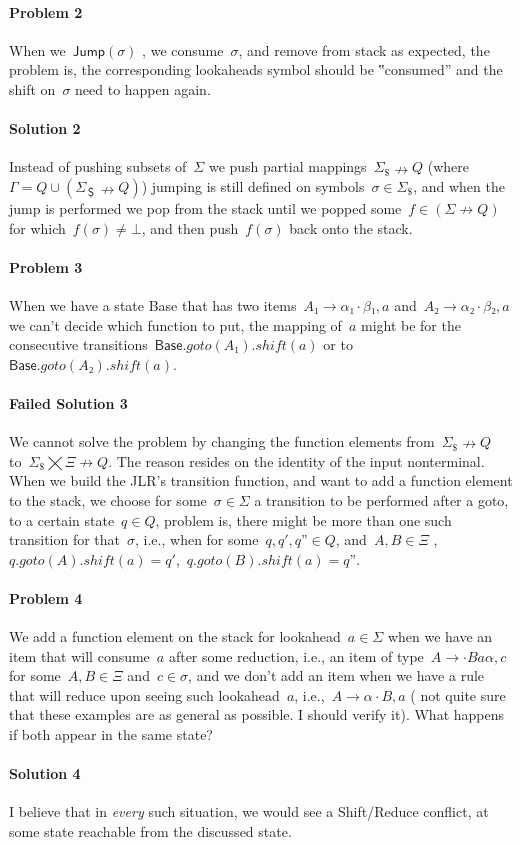 \paragraph{Problem 2} When we~$\textsf{Jump}(σ)$ , we consume~$σ$, and remove
  from stack as expected, the problem is, the corresponding lookaheads symbol
  should be ‟consumed” and the shift on~$σ$ need to happen again.

\paragraph{Solution 2} Instead of pushing subsets of~$Σ$ we push partial
  mappings~$Σ_{\$}↛Q$ (where~$Γ=Q∪(Σ_{＄}↛Q)$) jumping is still defined
  on symbols~$σ∈Σ_{\$}$, and when the jump is performed we pop from the stack
  until we popped some~$f∈(Σ↛Q)$ for which~$f(σ)≠⊥$, and then push~$f(σ)$ back onto the stack.

\paragraph{Problem 3} When we have a state \textsf{Base} that has
  two items~$A₁→α₁·β₁,a$ and~$A₂→α₂·β₂,a$ we can't decide which function to put,
  the mapping of~$a$ might be for the consecutive
  transitions~$\textsf{Base}.goto(A₁).shift(a)$ or to~$\textsf{Base}.goto(A₂).shift(a)$.

\paragraph{Failed Solution 3} We cannot solve the problem by changing the function elements from~$Σ_\$↛Q$
  to~$Σ_\$⨉Ξ↛Q$. The reason resides on the identity of the input nonterminal.
  When we build the JLR's transition function, and want to add a function element to the stack, we choose for some~$σ∈Σ$
  a transition to be performed after a goto, to a certain state~$q∈Q$, problem is, there might be more than one such transition
  for that~$σ$, i.e., when for some~$q,q',q”∈Q$, and~$A,B∈Ξ$ ,~$q.goto(A).shift(a)=q'$,~$q.goto(B).shift(a)=q”$.

\paragraph{Problem 4} We add a function element on the stack for lookahead~$a∈Σ$
  when we have an item that will consume~$a$ after some reduction,
  i.e., an item of type~$A→·Baα,c$ for some~$A,B∈Ξ$ and~$c∈σ$,
  and we don't add an item when we have a rule that will reduce
  upon seeing such lookahead~$a$, i.e.,~$A→α·B , a$
  ( not quite sure that these examples are as general as possible. I should verify it).
  What happens if both appear in the same state?

\paragraph{Solution 4} I believe that in \emph{every} such situation,
  we would see a Shift/Reduce conflict, at some state reachable from the discussed state.
